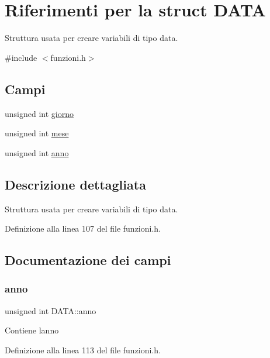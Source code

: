\hypertarget{struct_d_a_t_a}{}\section{Riferimenti per la struct D\+A\+TA}
\label{struct_d_a_t_a}


Struttura usata per creare variabili di tipo data.  




{\ttfamily \#include $<$funzioni.\+h$>$}

\subsection*{Campi}
\begin{DoxyCompactItemize}
\item 
unsigned int \hyperlink{struct_d_a_t_a_a5b7ee538f851d6654690c7abd5a73e95}{giorno}
\item 
unsigned int \hyperlink{struct_d_a_t_a_a01ae59e2eaf050acfab59d94732ab535}{mese}
\item 
unsigned int \hyperlink{struct_d_a_t_a_a51652b7ccc3b63d704943414ded3c38a}{anno}
\end{DoxyCompactItemize}


\subsection{Descrizione dettagliata}
Struttura usata per creare variabili di tipo data. 

Definizione alla linea 107 del file funzioni.\+h.



\subsection{Documentazione dei campi}
\mbox{\label{struct_d_a_t_a_a51652b7ccc3b63d704943414ded3c38a}} 
\subsubsection{\texorpdfstring{anno}{anno}}
{\footnotesize\ttfamily unsigned int D\+A\+T\+A\+::anno}

Contiene l\textquotesingle{}anno 

Definizione alla linea 113 del file funzioni.\+h.



